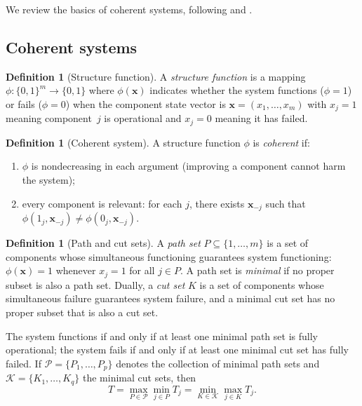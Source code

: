 \documentclass[12pt]{article}
\theoremstyle{definition}
\newtheorem{definition}[theorem]{Definition}
\theoremstyle{remark}
\begin{document}
We review the basics of coherent systems, following
\citet{BarlowProschan1975} and \citet{Samaniego2007}.

\subsection{Coherent systems}
\label{sec:coherent-def}

\begin{definition}[Structure function]
\label{def:structure-function}
A \emph{structure function} is a mapping
$\phi\colon \{0,1\}^m \to \{0,1\}$ where $\phi(\mathbf{x})$ indicates
whether the system functions ($\phi = 1$) or fails ($\phi = 0$) when
the component state vector is $\mathbf{x} = (x_1, \ldots, x_m)$ with
$x_j = 1$ meaning component~$j$ is operational and $x_j = 0$ meaning
it has failed.
\end{definition}

\begin{definition}[Coherent system]
\label{def:coherent}
A structure function $\phi$ is \emph{coherent} if:
\begin{enumerate}[label=(\roman*)]
  \item $\phi$ is nondecreasing in each argument (improving a component
    cannot harm the system);
  \item every component is relevant: for each $j$, there exists
    $\mathbf{x}_{-j}$ such that
    $\phi(1_j, \mathbf{x}_{-j}) \neq \phi(0_j, \mathbf{x}_{-j})$.
\end{enumerate}
\end{definition}

\begin{definition}[Path and cut sets]
\label{def:path-cut}
A \emph{path set} $P \subseteq \{1, \ldots, m\}$ is a set of components
whose simultaneous functioning guarantees system functioning:
$\phi(\mathbf{x}) = 1$ whenever $x_j = 1$ for all $j \in P$.
A path set is \emph{minimal} if no proper subset is also a path set.
Dually, a \emph{cut set} $K$ is a set of components whose simultaneous
failure guarantees system failure, and a minimal cut set has no proper
subset that is also a cut set.
\end{definition}

The system functions if and only if at least one minimal path set is
fully operational; the system fails if and only if at least one minimal
cut set has fully failed.  If $\mathcal{P} = \{P_1, \ldots, P_p\}$
denotes the collection of minimal path sets and
$\mathcal{K} = \{K_1, \ldots, K_q\}$ the minimal cut sets, then
\begin{equation}\label{eq:lifetime-paths-cuts}
  T = \max_{P \in \mathcal{P}} \min_{j \in P} T_j
    = \min_{K \in \mathcal{K}} \max_{j \in K} T_j.
\end{equation}
\end{document}
